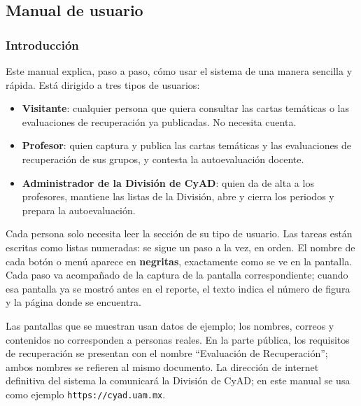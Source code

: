 \subsection{Manual de usuario}\label{apx:manual-usuario}
\justifying

\newcommand{\verfig}[1]{Figura~\ref{#1}, pág.~\pageref{#1}}

\newcommand{\figmanual}[3]{%
    \par\medskip
    \noindent\begin{minipage}{\textwidth}
        \centering
        \captura[0.9\textwidth]{screenshots/#1}
        \captionof{figure}{#2}\label{#3}
    \end{minipage}
    \par\medskip
}

\subsubsection{Introducción}
Este manual explica, paso a paso, cómo usar el sistema de una manera sencilla y rápida. Está dirigido a tres tipos de usuarios:

\begin{itemize}
    \item \textbf{Visitante}: cualquier persona que quiera consultar las cartas temáticas o las evaluaciones de recuperación ya publicadas. No necesita cuenta.
    \item \textbf{Profesor}: quien captura y publica las cartas temáticas y las evaluaciones de recuperación de sus grupos, y contesta la autoevaluación docente.
    \item \textbf{Administrador de la División de CyAD}: quien da de alta a los profesores, mantiene las listas de la División, abre y cierra los periodos y prepara la autoevaluación.
\end{itemize}

Cada persona solo necesita leer la sección de su tipo de usuario. Las tareas están escritas como listas numeradas: se sigue un paso a la vez, en orden. El nombre de cada botón o menú aparece en \textbf{negritas}, exactamente como se ve en la pantalla. Cada paso va acompañado de la captura de la pantalla correspondiente; cuando esa pantalla ya se mostró antes en el reporte, el texto indica el número de figura y la página donde se encuentra.

Las pantallas que se muestran usan datos de ejemplo; los nombres, correos y contenidos no corresponden a personas reales. En la parte pública, los requisitos de recuperación se presentan con el nombre ``Evaluación de Recuperación''; ambos nombres se refieren al mismo documento. La dirección de internet definitiva del sistema la comunicará la División de CyAD; en este manual se usa como ejemplo \texttt{https://cyad.uam.mx}.

